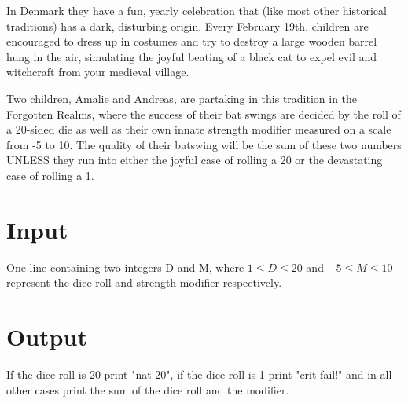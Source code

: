 

In Denmark they have a fun, yearly celebration that (like most other historical traditions) has a dark, disturbing origin. Every February 19th, children are encouraged to dress up in costumes and try to destroy a large wooden barrel hung in the air, simulating the joyful beating of a black cat to expel evil and witchcraft from your medieval village.

Two children, Amalie and Andreas, are partaking in this tradition in the Forgotten Realms, where the success of their bat swings are decided by the roll of a 20-sided die as well as their own innate strength modifier measured on a scale from -5 to 10. The quality of their batswing will be the sum of these two numbers UNLESS they run into either the joyful case of rolling a 20 or the devastating case of rolling a 1.

\section*{Input}
One line containing two integers D and M, where $1\le D \le 20$ and $-5\le M \le 10$ represent the dice roll and strength modifier respectively.

\section*{Output}
If the dice roll is 20 print "nat 20", if the dice roll is 1 print "crit fail!" and in all other cases print the sum of the dice roll and the modifier.
